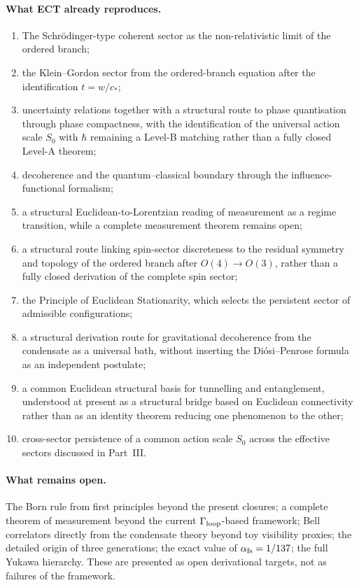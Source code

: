 \documentclass[11pt,a4paper]{article}
\begin{document}
\paragraph{What ECT already reproduces.}
\begin{enumerate}[label=(\roman*)]
\item The Schr\"odinger-type coherent sector as the non-relativistic limit of the ordered branch;
\item the Klein--Gordon sector from the ordered-branch equation after the identification $t = w/c_*$;
\item uncertainty relations together with a structural route to phase quantisation through phase compactness, with the identification of the universal action scale $S_0$ with $\hbar$ remaining a Level-B matching rather than a fully closed Level-A theorem;
\item decoherence and the quantum--classical boundary through the influence-functional formalism;
\item a structural Euclidean-to-Lorentzian reading of measurement as a regime transition, while a complete measurement theorem remains open;
\item a structural route linking spin-sector discreteness to the residual symmetry and topology of the ordered branch after $O(4)\to O(3)$, rather than a fully closed derivation of the complete spin sector;
\item the Principle of Euclidean Stationarity, which selects the persistent sector of admissible configurations;
\item a structural derivation route for gravitational decoherence from the condensate as a universal bath, without inserting the Di\'osi--Penrose formula as an independent postulate;
\item a common Euclidean structural basis for tunnelling and entanglement, understood at present as a structural bridge based on Euclidean connectivity rather than as an identity theorem reducing one phenomenon to the other;
\item cross-sector persistence of a common action scale $S_0$ across the effective sectors discussed in Part~III.
\end{enumerate}

\paragraph{What remains open.}
The Born rule from first principles beyond the present closures; a complete theorem of measurement beyond the current $\Gamma_{\rm loop}$-based framework; Bell correlators directly from the condensate theory beyond toy visibility proxies; the detailed origin of three generations; the exact value of $\alpha_{\rm fs}=1/137$; the full Yukawa hierarchy.  These are presented as open derivational targets, not as failures of the framework.
\end{document}
